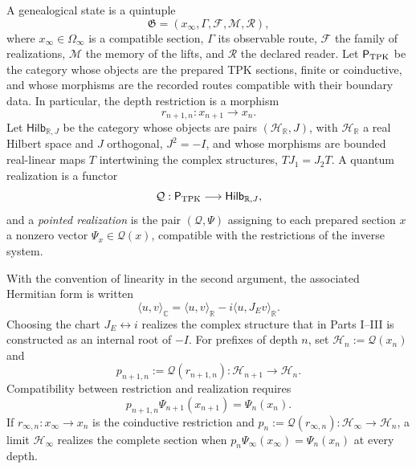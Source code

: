 \begin{definition}
A genealogical state is a quintuple
\begin{equation}
 \mathfrak G=(x_\infty,\Gamma,\mathcal F,\mathcal M,\mathcal R),
 \label{eq:estado-genealogico-realizado-rev2}
\end{equation}
where \(x_\infty\in\Omega_\infty\) is a compatible section,
\(\Gamma\) its observable route, \(\mathcal F\) the family of realizations,
\(\mathcal M\) the memory of the lifts, and \(\mathcal R\) the declared
reader. Let \(\mathsf P_{\rm TPK}\) be the category whose objects are the
prepared TPK sections, finite or coinductive, and whose morphisms are the
recorded routes compatible with their boundary data. In particular, the
depth restriction is a morphism
\[
 r_{n+1,n}:x_{n+1}\longrightarrow x_n.
\]
Let \(\mathsf{Hilb}_{\mathbb R,J}\) be the category whose objects
are pairs \((\mathcal H_{\mathbb R},J)\), with \(\mathcal H_{\mathbb R}\)
a real Hilbert space and \(J\) orthogonal, \(J^2=-I\), and whose morphisms are
bounded real-linear maps \(T\) intertwining the complex
structures, \(TJ_1=J_2T\). A quantum realization is a functor
\[
 \mathcal Q:\mathsf P_{\rm TPK}\longrightarrow
 \mathsf{Hilb}_{\mathbb R,J},
\]
and a \emph{pointed realization} is the pair \((\mathcal Q,\Psi)\) assigning
to each prepared section \(x\) a nonzero vector
\(\Psi_x\in\mathcal Q(x)\), compatible with the restrictions of the inverse
system.
\end{definition}

With the convention of linearity in the second argument, the associated Hermitian form
is written
\[
 \langle u,v\rangle_{\mathbb C}
 =\langle u,v\rangle_{\mathbb R}
  -i\langle u,J_E v\rangle_{\mathbb R}.
\]
Choosing the chart \(J_E\leftrightarrow i\) realizes the complex structure that
in Parts I--III is constructed as an internal root of \(-I\). For prefixes of
depth \(n\), set
\(\mathcal H_n:=\mathcal Q(x_n)\) and
\[
 p_{n+1,n}:=\mathcal Q(r_{n+1,n}):
 \mathcal H_{n+1}\longrightarrow\mathcal H_n.
\]
Compatibility between restriction and realization requires
\begin{equation}
 p_{n+1,n}\Psi_{n+1}(x_{n+1})=\Psi_n(x_n).
 \label{eq:compatibilidad-realizacion-hilbert-rev2}
\end{equation}
If \(r_{\infty,n}:x_\infty\to x_n\) is the coinductive restriction and
\(p_n:=\mathcal Q(r_{\infty,n}):\mathcal H_\infty\to\mathcal H_n\), a
limit \(\mathcal H_\infty\) realizes the complete section when
\(p_n\Psi_\infty(x_\infty)=\Psi_n(x_n)\) at every depth.

